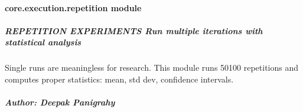 \documentclass[letterpaper,10pt,english]{sphinxmanual}
\begin{document}
\sphinxstepscope


\paragraph{core.execution.repetition module}
\label{\detokenize{core.execution.repetition:module-core.execution.repetition}}\label{\detokenize{core.execution.repetition:core-execution-repetition-module}}\label{\detokenize{core.execution.repetition::doc}}

\subparagraph{REPETITION EXPERIMENTS \textendash{} Run multiple iterations with statistical analysis}
\label{\detokenize{core.execution.repetition:repetition-experiments-run-multiple-iterations-with-statistical-analysis}}\begin{description}
\sphinxAtStartPar
Single runs are meaningless for research. This module runs 50\sphinxhyphen{}100 repetitions
and computes proper statistics: mean, std dev, confidence intervals.

\end{description}


\subparagraph{Author: Deepak Panigrahy}
\label{\detokenize{core.execution.repetition:author-deepak-panigrahy}}
\end{document}
